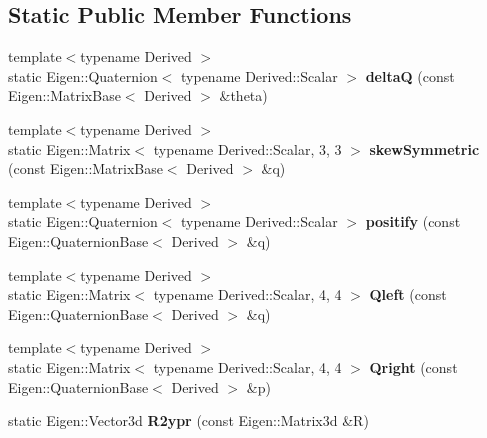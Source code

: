 \subsection*{Static Public Member Functions}
\begin{DoxyCompactItemize}
\item 
\mbox{\label{classUtility_ad6db663af81d0dfb446f217a7032f28b}} 
{\footnotesize template$<$typename Derived $>$ }\\static Eigen\+::\+Quaternion$<$ typename Derived\+::\+Scalar $>$ {\bfseries deltaQ} (const Eigen\+::\+Matrix\+Base$<$ Derived $>$ \&theta)
\item 
\mbox{\label{classUtility_af2736e24a6c1dc11e62e7cffa9e9502e}} 
{\footnotesize template$<$typename Derived $>$ }\\static Eigen\+::\+Matrix$<$ typename Derived\+::\+Scalar, 3, 3 $>$ {\bfseries skew\+Symmetric} (const Eigen\+::\+Matrix\+Base$<$ Derived $>$ \&q)
\item 
\mbox{\label{classUtility_a686a533a24f020b66342708d5bf0730c}} 
{\footnotesize template$<$typename Derived $>$ }\\static Eigen\+::\+Quaternion$<$ typename Derived\+::\+Scalar $>$ {\bfseries positify} (const Eigen\+::\+Quaternion\+Base$<$ Derived $>$ \&q)
\item 
\mbox{\label{classUtility_a1006727702d0894f4ffbd18081c080a3}} 
{\footnotesize template$<$typename Derived $>$ }\\static Eigen\+::\+Matrix$<$ typename Derived\+::\+Scalar, 4, 4 $>$ {\bfseries Qleft} (const Eigen\+::\+Quaternion\+Base$<$ Derived $>$ \&q)
\item 
\mbox{\label{classUtility_a65053cec3b81ab32f5e55d1d81f3498a}} 
{\footnotesize template$<$typename Derived $>$ }\\static Eigen\+::\+Matrix$<$ typename Derived\+::\+Scalar, 4, 4 $>$ {\bfseries Qright} (const Eigen\+::\+Quaternion\+Base$<$ Derived $>$ \&p)
\item 
\mbox{\label{classUtility_a9a4d4e66c5288c4a8fb5d2e6a0faf840}} 
static Eigen\+::\+Vector3d {\bfseries R2ypr} (const Eigen\+::\+Matrix3d \&R)
\item 
\mbox{\label{classUtility_a2cf771f4b84aa9056e60119953f91917}} 

\end{DoxyCompactItemize}

